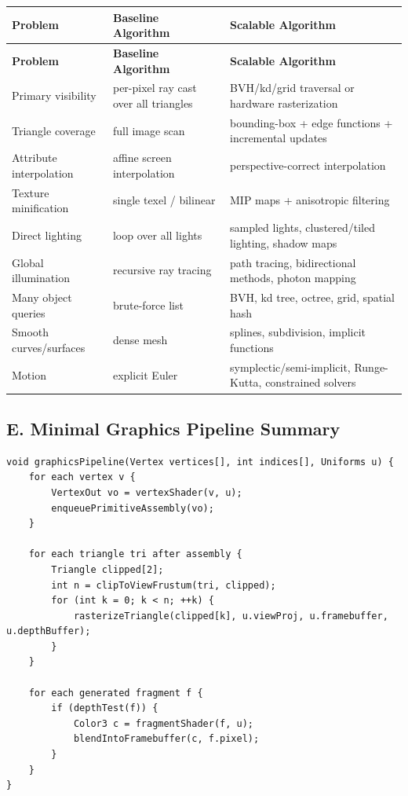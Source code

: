 \documentclass[10pt,letterpaper]{article}
\begin{document}
\begin{longtable}{L{0.20\textwidth}L{0.34\textwidth}L{0.38\textwidth}}
\toprule
\textbf{Problem} & \textbf{Baseline Algorithm} & \textbf{Scalable Algorithm} \\
\midrule\endfirsthead
\toprule
\textbf{Problem} & \textbf{Baseline Algorithm} & \textbf{Scalable Algorithm} \\
\midrule\endhead
Primary visibility & per-pixel ray cast over all triangles & BVH/kd/grid traversal or hardware rasterization \\
Triangle coverage & full image scan & bounding-box + edge functions + incremental updates \\
Attribute interpolation & affine screen interpolation & perspective-correct interpolation \\
Texture minification & single texel / bilinear & MIP maps + anisotropic filtering \\
Direct lighting & loop over all lights & sampled lights, clustered/tiled lighting, shadow maps \\
Global illumination & recursive ray tracing & path tracing, bidirectional methods, photon mapping \\
Many object queries & brute-force list & BVH, kd tree, octree, grid, spatial hash \\
Smooth curves/surfaces & dense mesh & splines, subdivision, implicit functions \\
Motion & explicit Euler & symplectic/semi-implicit, Runge-Kutta, constrained solvers \\
\bottomrule
\end{longtable}

\subsection{E. Minimal Graphics Pipeline Summary}

\begin{verbatim}
void graphicsPipeline(Vertex vertices[], int indices[], Uniforms u) {
    for each vertex v {
        VertexOut vo = vertexShader(v, u);
        enqueuePrimitiveAssembly(vo);
    }

    for each triangle tri after assembly {
        Triangle clipped[2];
        int n = clipToViewFrustum(tri, clipped);
        for (int k = 0; k < n; ++k) {
            rasterizeTriangle(clipped[k], u.viewProj, u.framebuffer, u.depthBuffer);
        }
    }

    for each generated fragment f {
        if (depthTest(f)) {
            Color3 c = fragmentShader(f, u);
            blendIntoFramebuffer(c, f.pixel);
        }
    }
}
\end{verbatim}
\end{document}
